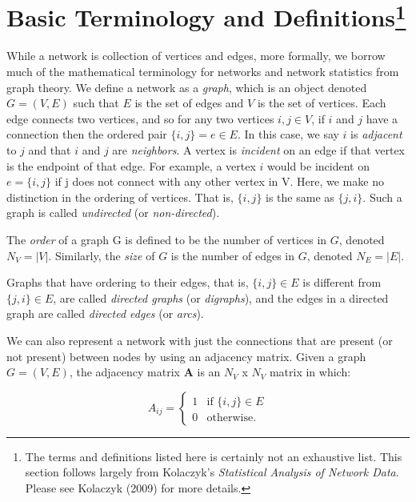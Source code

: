 \documentclass[12pt,twoside]{amherstthesis}
\begin{document}
  \section[Basic Terminology and Definitions]{\texorpdfstring{Basic
  Terminology and Definitions\footnote{The terms and definitions listed
    here is certainly not an exhaustive list. This section follows largely
    from Kolaczyk's \emph{Statistical Analysis of Network Data}. Please
    see Kolaczyk (2009) for more details.}}{Basic Terminology and Definitions}}\label{basic-terminology-and-definitions-1}
  
  While a network is collection of vertices and edges, more formally, we
  borrow much of the mathematical terminology for networks and network
  statistics from graph theory. We define a network as a \emph{graph},
  which is an object denoted \(G = (V, E)\) such that \(E\) is the set of
  edges and \(V\) is the set of vertices. Each edge connects two vertices,
  and so for any two vertices \(i, j \in V\), if \(i\) and \(j\) have a
  connection then the ordered pair \(\{i, j\} = e \in E\). In this case,
  we say \(i\) is \emph{adjacent} to \(j\) and that \(i\) and \(j\) are
  \emph{neighbors}. A vertex is \emph{incident} on an edge if that vertex
  is the endpoint of that edge. For example, a vertex \(i\) would be
  incident on \(e = \{i, j\}\) if j does not connect with any other vertex
  in V. Here, we make no distinction in the ordering of vertices. That is,
  \(\{i, j\}\) is the same as \(\{j, i\}\). Such a graph is called
  \emph{undirected} (or \emph{non-directed}).
  
  The \emph{order} of a graph G is defined to be the number of vertices in
  \(G\), denoted \(N_V = |V|\). Similarly, the \emph{size} of \(G\) is the
  number of edges in \(G\), denoted \(N_E = |E|\).
  
  Graphs that have ordering to their edges, that is, \(\{i, j\} \in E\) is
  different from \(\{j, i\} \in E\), are called \emph{directed graphs} (or
  \emph{digraphs}), and the edges in a directed graph are called
  \emph{directed edges} (or \emph{arcs}).
  
  We can also represent a network with just the connections that are
  present (or not present) between nodes by using an adjacency matrix.
  Given a graph \(G = (V, E)\), the adjacency matrix \(\textbf{A}\) is an
  \(N_V\) x \(N_V\) matrix in which:
  
  \[ A_{ij} = \begin{cases}
      1 & \text{if } \{i, j\} \in E \\
      0 & \text{otherwise.} 
    \end{cases}
  \]
  
\end{document}
